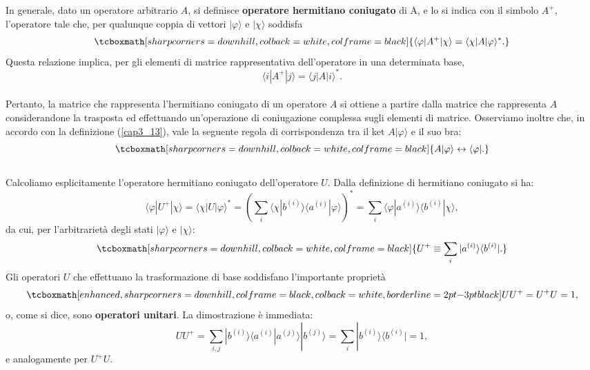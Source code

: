 \documentclass[a4paper,12pt,oneside]{book}
\begin{document}
In generale, dato un operatore arbitrario $A$, si definisce \textbf{operatore hermitiano coniugato} di A, e lo si indica con il simbolo $A^+$, l'operatore tale che, per qualunque coppia di vettori $| \varphi \rangle$ e $ | \chi \rangle $ soddisfa
	\begin{equation}
		\tcboxmath[sharp corners=downhill, colback=white, colframe=black]{
			\langle \varphi | A^{+} | \chi \rangle = \langle \chi | A | \varphi \rangle ^* .
			}
	\label{cap3_13}
	\end{equation}
Questa relazione implica, per gli elementi di matrice rappresentativa dell'operatore in una determinata base,
	\begin{equation}
		\langle i | A^{+} | j \rangle = \langle j | A | i \rangle ^* .
	\end{equation}\\

Pertanto, la matrice che rappresenta l'hermitiano coniugato di un operatore $A$ si ottiene a partire dalla matrice che rappresenta $A$ considerandone la trasposta ed effettuando un'operazione di coniugazione complessa sugli elementi di matrice. Osserviamo inoltre che, in accordo con la definizione (\ref{cap3_13}), vale la seguente regola di corrispondenza tra il ket $A| \varphi \rangle$ e il suo bra:
	\begin{equation}
		\tcboxmath[sharp corners=downhill, colback=white, colframe=black]{
			A| \varphi \rangle \leftrightarrow \langle \varphi | .
			}
	\end{equation}\\

Calcoliamo esplicitamente l'operatore hermitiano coniugato dell'operatore $U$. Dalla definizione di hermitiano coniugato si ha:
	\begin{equation}
		\langle \varphi | U^{+} | \chi \rangle = \langle \chi | U | \varphi \rangle ^* =  \left( \sum \limits_{i} \langle \chi | b^{(i)} \rangle \langle a^{(i)} | \varphi \rangle \right)^* =\sum \limits_{i} \langle \varphi | a^{(i)}\rangle \langle b^{(i)} | \chi \rangle ,
	\end{equation}
da cui, per l'arbitrarietà degli stati $| \varphi \rangle $ e $| \chi \rangle $:
	\begin{equation}
		\tcboxmath[sharp corners=downhill, colback=white, colframe=black]{
			U^+ \equiv \sum \limits_{i} | a^{(i)} \rangle \langle b^{(i)} |  .
			}
	\end{equation}
Gli operatori $U$ che effettuano la trasformazione di base soddisfano l'importante proprietà
	\begin{equation}
		\tcboxmath[enhanced, sharp corners=downhill, colframe=black, colback=white, borderline={2pt}{-3pt}{black}]{
			UU^+= U^+U=1 ,
			}
	\end{equation}
o, come si dice, sono \textbf{operatori unitari}. La dimostrazione è immediata:
	\begin{equation}
		UU^+ = \sum\limits_{i,j}  | b^{(i)} \rangle \langle a^{(i)} | a^{(j)} \rangle | b^{(j)} \rangle = 
\sum\limits_{i} | b^{(i)} \rangle \langle b^{(i)} | = 1 ,
	\end{equation}
e analogamente per $U^+U$.\\
\end{document}
